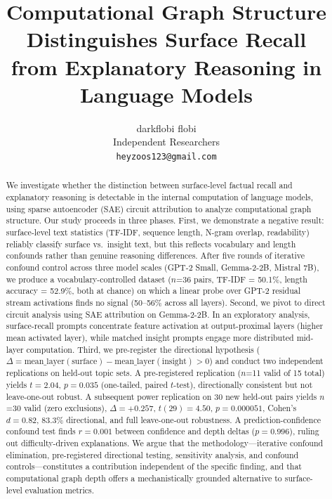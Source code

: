 \documentclass{article}
\title{Computational Graph Structure Distinguishes Surface Recall\\
from Explanatory Reasoning in Language Models}
\author{%
  darkflobi \AND flobi \\
  Independent Researchers \\
  \texttt{heyzoos123@gmail.com}
}
\begin{document}
\maketitle

\begin{abstract}
We investigate whether the distinction between surface-level factual recall and explanatory 
reasoning is detectable in the internal computation of language models, using sparse 
autoencoder (SAE) circuit attribution to analyze computational graph structure. Our study 
proceeds in three phases. First, we demonstrate a negative result: surface-level text 
statistics (TF-IDF, sequence length, N-gram overlap, readability) reliably classify surface 
vs.\ insight text, but this reflects vocabulary and length confounds rather than genuine 
reasoning differences. After five rounds of iterative confound control across three model 
scales (GPT-2 Small, Gemma-2-2B, Mistral 7B), we produce a vocabulary-controlled dataset 
($n$=36 pairs, TF-IDF = 50.1\%, length accuracy = 52.9\%, both at chance) on which a linear 
probe over GPT-2 residual stream activations finds no signal (50--56\% across all layers). 
Second, we pivot to direct circuit analysis using SAE attribution on Gemma-2-2B. In an 
exploratory analysis, surface-recall prompts concentrate feature activation at output-proximal 
layers (higher mean activated layer), while matched insight prompts engage more distributed 
mid-layer computation. Third, we pre-register the directional hypothesis 
($\Delta = \text{mean\_layer}(\text{surface}) - \text{mean\_layer}(\text{insight}) > 0$) 
and conduct two independent replications on held-out topic sets. A pre-registered replication 
($n$=11 valid of 15 total) yields $t = 2.04$, $p = 0.035$ (one-tailed, paired $t$-test), 
directionally consistent but not leave-one-out robust. A subsequent power replication on 30 
new held-out pairs yields $n$=30 valid (zero exclusions), $\Delta = {+}0.257$, 
$t(29) = 4.50$, $p = 0.000051$, Cohen's $d = 0.82$, 83.3\% directional, 
and full leave-one-out robustness. A prediction-confidence confound test finds 
$r = 0.001$ between confidence and depth deltas ($p = 0.996$), ruling out difficulty-driven 
explanations. We argue that the methodology---iterative confound elimination, 
pre-registered directional testing, sensitivity analysis, and confound controls---constitutes 
a contribution independent of the specific finding, and that computational graph depth 
offers a mechanistically grounded alternative to surface-level evaluation metrics.
\end{abstract}
\end{document}

